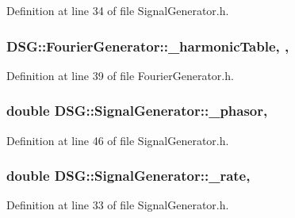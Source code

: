Definition at line 34 of file Signal\+Generator.\+h.

\hypertarget{classDSG_1_1FourierGenerator_aedac2cf90997418836d064c90540249d}{
\subsubsection[{\+\_\+harmonic\+Table}]{ D\+S\+G\+::\+Fourier\+Generator\+::\+\_\+harmonic\+Table\hspace{0.3cm}{\ttfamily [static]}, {\ttfamily [protected]}, {\ttfamily [inherited]}}}\label{classDSG_1_1FourierGenerator_aedac2cf90997418836d064c90540249d}


Definition at line 39 of file Fourier\+Generator.\+h.

\hypertarget{classDSG_1_1SignalGenerator_ac2271b582bf699275f077ecb642a8cd9}{
\subsubsection[{\+\_\+phasor}]{\setlength{\rightskip}{0pt plus 5cm}double D\+S\+G\+::\+Signal\+Generator\+::\+\_\+phasor\hspace{0.3cm}{\ttfamily [protected]}, {\ttfamily [inherited]}}}\label{classDSG_1_1SignalGenerator_ac2271b582bf699275f077ecb642a8cd9}


Definition at line 46 of file Signal\+Generator.\+h.

\hypertarget{classDSG_1_1SignalGenerator_aa10f6c85d9adee901139ea7fb346f39d}{
\subsubsection[{\+\_\+rate}]{\setlength{\rightskip}{0pt plus 5cm}double D\+S\+G\+::\+Signal\+Generator\+::\+\_\+rate\hspace{0.3cm}{\ttfamily [protected]}, {\ttfamily [inherited]}}}\label{classDSG_1_1SignalGenerator_aa10f6c85d9adee901139ea7fb346f39d}


Definition at line 33 of file Signal\+Generator.\+h.

